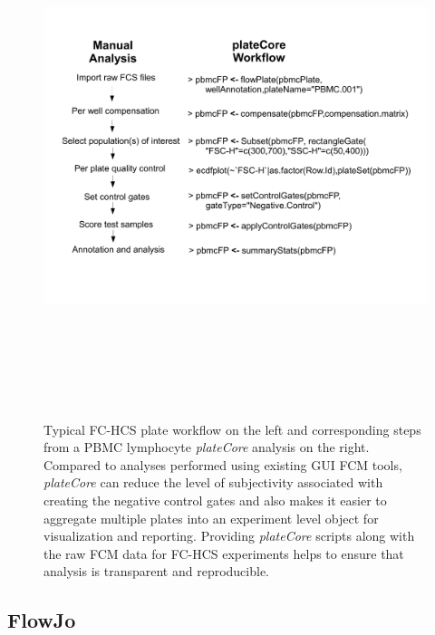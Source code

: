 \documentclass[12pt]{article}
\newcommand{\Rpackage}[1]{{\textit{#1}}}
\begin{document}
\begin{figure}
\centering
\includegraphics[width=7in,height=6in]{analysisSteps.pdf}
\caption{Typical FC-HCS plate workflow on the left and corresponding steps from
a PBMC lymphocyte \Rpackage{plateCore} analysis on the right. Compared to
analyses performed using existing GUI FCM tools, \Rpackage{plateCore} can
reduce the level of subjectivity associated with creating the negative control
gates and also makes it easier to aggregate multiple plates into an experiment
level object for visualization and reporting. Providing \Rpackage{plateCore}
scripts along with the raw FCM data for FC-HCS experiments helps to ensure that
analysis is transparent and reproducible.}
\label{fig:analysis}
\end{figure}

\subsection*{FlowJo}
\end{document}
